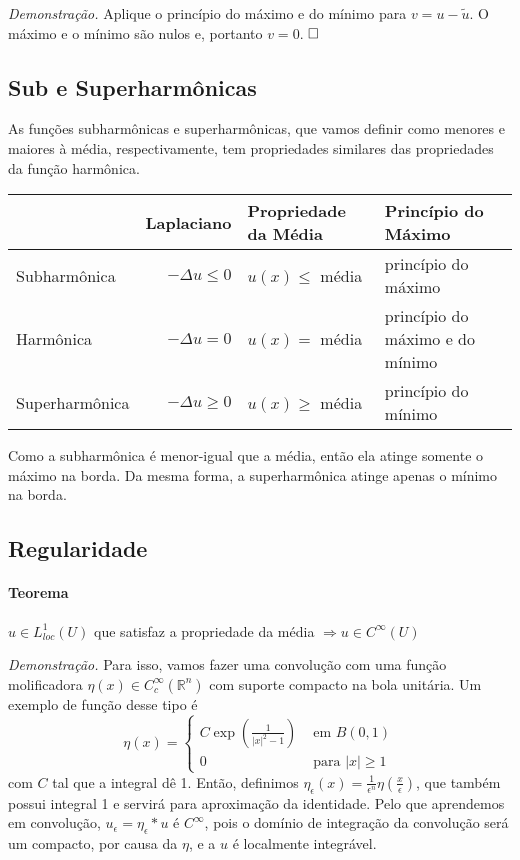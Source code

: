 \documentclass[11pt]{article}
\newcommand{\qed}{$\hfill\square$}
\newcommand{\Rn}{{\mathbb{R}^n}}
\newcommand{\e}{\epsilon}
\begin{document}
\textit{Demonstração.} Aplique o princípio do máximo e do mínimo para \( v = u - \tilde{u} \). O máximo e o mínimo são nulos e, portanto \( v=0 \). \qed

\subsection{Sub e Superharmônicas}

As funções subharmônicas e superharmônicas, que vamos definir como menores e maiores à média, respectivamente, tem propriedades similares das propriedades da função harmônica.

\begin{tabular}{l r l l}
	& Laplaciano & Propriedade da Média & Princípio do Máximo \\\hline 
	\rule{0pt}{5mm}Subharmônica & \( -\Delta u \leq 0 \) & \( u(x) \leq \) média & princípio do máximo\\
	Harmônica & \( -\Delta u =0 \) & \( u(x) =  \) média & princípio do máximo  e do mínimo \\
	Superharmônica & \( -\Delta u \geq 0  \) & \( u(x) \geq  \) média & princípio do mínimo \\ \hline 
\end{tabular}

Como a subharmônica é menor-igual que a média, então ela atinge somente o máximo na borda. Da mesma forma, a superharmônica atinge apenas o mínimo na borda. 



\subsection{Regularidade}


\paragraph{Teorema}\( u \in L^1_{loc}(U) \) que satisfaz a propriedade da média \( \Rightarrow u \in C^\infty(U) \) 

\textit{Demonstração.} Para isso, vamos fazer uma convolução com uma função molificadora \( \eta(x) \in C^\infty_c(\Rn) \) com suporte compacto na bola unitária. Um exemplo de função desse tipo é \[ \eta(x) = \begin{cases}
	C \exp\left(\frac{1}{|x|^2-1}\right) &\text{ em } B(0, 1)\\
	0 &\text{ para } |x|\geq 1
\end{cases} \] com \( C \) tal que a integral dê 1. Então, definimos \( \eta_\e(x) = \frac{1}{\e^n}\eta\left(\frac{x}{\e}\right) \), que também possui integral 1 e servirá para aproximação da identidade. Pelo que aprendemos em convolução, \( u_\e = \eta_\e * u \) é \( C^\infty \), pois o domínio de integração da convolução será um compacto, por causa da \( \eta \), e a \( u \) é localmente integrável.
\end{document}
